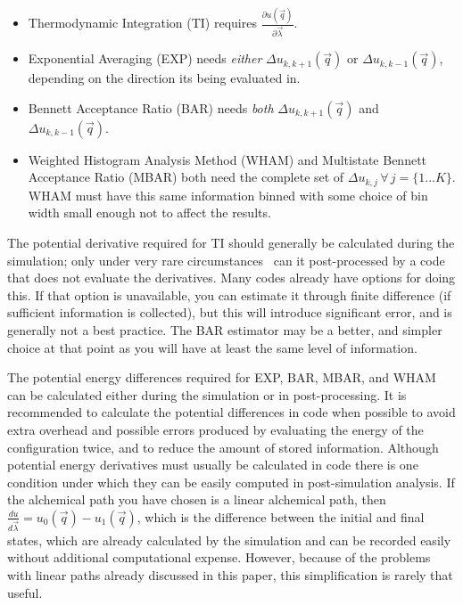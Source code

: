\documentclass[9pt,bestpractices]{livecoms}
\begin{document}
\begin{itemize}
    \item Thermodynamic Integration (TI) requires $\frac{\partial u(\vec{q})}{\partial\vec{\lambda}}$.
    \item Exponential Averaging (EXP) needs \textit{either} $\Delta u_{k,k+1}(\vec{q})$ or $\Delta u_{k,k-1}(\vec{q})$, depending on the direction its being evaluated in.
    \item Bennett Acceptance Ratio (BAR) needs \textit{both} $\Delta u_{k,k+1}(\vec{q})$ and $\Delta u_{k,k-1}(\vec{q})$.
    \item Weighted Histogram Analysis Method (WHAM) and Multistate Bennett Acceptance Ratio (MBAR) both need the complete set of $\Delta u_{k,j} \, \forall \, j=\{1...K\}$. WHAM must have this same information binned with some choice of bin width small enough not to affect the results.
\end{itemize}

The potential derivative required for TI should generally be calculated during the simulation; only under very rare circumstances~\cite{naden2015linear} can it post-processed by a code that does not evaluate the derivatives. Many codes already have options for doing this.
If that option is unavailable, you can estimate it through finite difference (if sufficient information is collected), but this will introduce significant error, and is generally not a best practice. The BAR estimator may be a better, and simpler choice at that point as you will have at least the same level of information. 

The potential energy differences required for EXP, BAR, MBAR, and WHAM can be calculated either during the simulation or in post-processing. It is recommended to calculate the potential differences in code when possible to avoid extra overhead and possible errors produced by evaluating the energy of the configuration twice, and to reduce the amount of stored information. 
Although potential energy derivatives must usually be calculated in code there is one condition under which they can be easily computed in post-simulation analysis. 
If the alchemical path you have chosen is a linear alchemical path, then $\frac{du}{d\vec{\lambda}} = u_0(\vec{q}) - u_1(\vec{q})$, which is the difference between the initial and final states, which are already calculated by the simulation and can be recorded easily without additional computational expense. 
However, because of the problems with linear paths already discussed in this paper, this simplification is rarely that useful.
\end{document}
